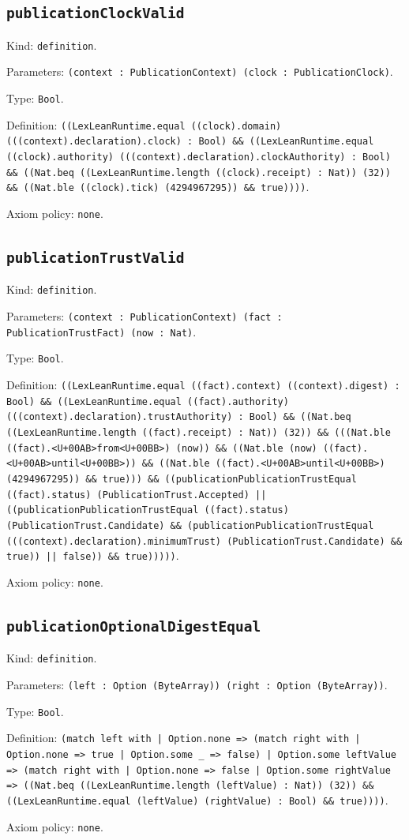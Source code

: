 \documentclass[11pt]{article}
\begin{document}
\subsection*{\texttt{publicationClockValid}}
\noindent Kind: \texttt{definition}.\par
\noindent Parameters: \texttt{(context : PublicationContext) (clock : PublicationClock)}.\par
\noindent Type: \texttt{Bool}.\par
\noindent Definition: \texttt{((LexLeanRuntime.equal ((clock).domain) (((context).declaration).clock) : Bool) \&\& ((LexLeanRuntime.equal ((clock).authority) (((context).declaration).clockAuthority) : Bool) \&\& ((Nat.beq ((LexLeanRuntime.length ((clock).receipt) : Nat)) (32)) \&\& ((Nat.ble ((clock).tick) (4294967295)) \&\& true))))}.\par
\noindent Axiom policy: \texttt{none}.\par
\subsection*{\texttt{publicationTrustValid}}
\noindent Kind: \texttt{definition}.\par
\noindent Parameters: \texttt{(context : PublicationContext) (fact : PublicationTrustFact) (now : Nat)}.\par
\noindent Type: \texttt{Bool}.\par
\noindent Definition: \texttt{((LexLeanRuntime.equal ((fact).context) ((context).digest) : Bool) \&\& ((LexLeanRuntime.equal ((fact).authority) (((context).declaration).trustAuthority) : Bool) \&\& ((Nat.beq ((LexLeanRuntime.length ((fact).receipt) : Nat)) (32)) \&\& (((Nat.ble ((fact).<U+00AB>from<U+00BB>) (now)) \&\& ((Nat.ble (now) ((fact).<U+00AB>until<U+00BB>)) \&\& ((Nat.ble ((fact).<U+00AB>until<U+00BB>) (4294967295)) \&\& true))) \&\& ((publicationPublicationTrustEqual ((fact).status) (PublicationTrust.Accepted) || ((publicationPublicationTrustEqual ((fact).status) (PublicationTrust.Candidate) \&\& (publicationPublicationTrustEqual (((context).declaration).minimumTrust) (PublicationTrust.Candidate) \&\& true)) || false)) \&\& true)))))}.\par
\noindent Axiom policy: \texttt{none}.\par
\subsection*{\texttt{publicationOptionalDigestEqual}}
\noindent Kind: \texttt{definition}.\par
\noindent Parameters: \texttt{(left : Option (ByteArray)) (right : Option (ByteArray))}.\par
\noindent Type: \texttt{Bool}.\par
\noindent Definition: \texttt{(match left with | Option.none => (match right with | Option.none => true | Option.some \_ => false) | Option.some leftValue => (match right with | Option.none => false | Option.some rightValue => ((Nat.beq ((LexLeanRuntime.length (leftValue) : Nat)) (32)) \&\& ((LexLeanRuntime.equal (leftValue) (rightValue) : Bool) \&\& true))))}.\par
\noindent Axiom policy: \texttt{none}.\par
\end{document}
